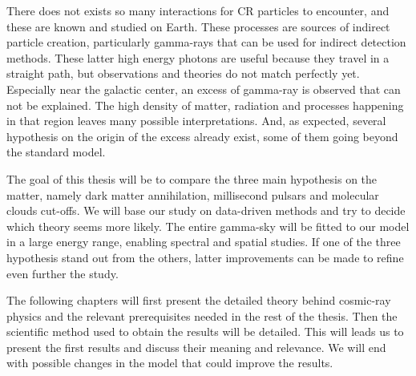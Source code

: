 There does not exists so many interactions for CR particles to encounter, and these are known and studied on Earth. These processes are sources of indirect particle creation, particularly gamma-rays that can be used for indirect detection methods. These latter high energy photons are useful because they travel in a straight path, but observations and theories do not match perfectly yet. Especially near the galactic center, an excess of gamma-ray is observed that can not be explained. The high density of matter, radiation and processes happening in that region leaves many possible interpretations. And, as expected, several hypothesis on the origin of the excess already exist, some of them going beyond the standard model.

The goal of this thesis will be to compare the three main hypothesis on the matter, namely dark matter annihilation, millisecond pulsars and molecular clouds cut-offs. We will base our study on data-driven methods and try to decide which theory seems more likely. The entire gamma-sky will be fitted to our model in a large energy range, enabling spectral and spatial studies. If one of the three hypothesis stand out from the others, latter improvements can be made to refine even further the study.

The following chapters will first present the detailed theory behind cosmic-ray physics and the relevant prerequisites needed in the rest of the thesis. Then the scientific method used to obtain the results will be detailed. This will leads us to present the first results and discuss their meaning and relevance. We will end with possible changes in the model that could improve the results.


	
	



